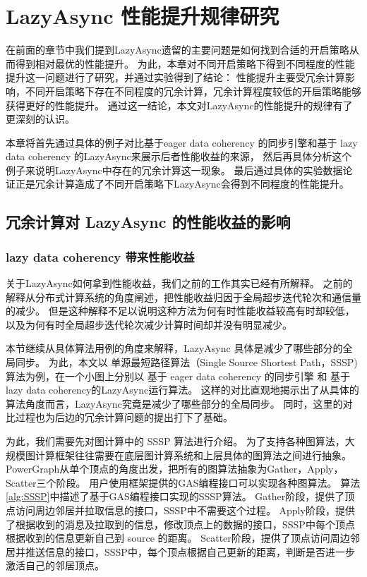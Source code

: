 

\chapter{LazyAsync 性能提升规律研究}
在前面的章节中我们提到LazyAsync遗留的主要问题是如何找到合适的开启策略从而得到相对最优的性能提升。
为此，本章对不同开启策略下得到不同程度的性能提升这一问题进行了研究，并通过实验得到了结论：
性能提升主要受冗余计算影响，不同开启策略下存在不同程度的冗余计算，冗余计算程度较低的开启策略能够获得更好的性能提升。
通过这一结论，本文对LazyAsync的性能提升的规律有了更深刻的认识。

本章将首先通过具体的例子对比基于eager data coherency 的同步引擎和基于 lazy data coherency 的LazyAsync来展示后者性能收益的来源，
然后再具体分析这个例子来说明LazyAsync中存在的冗余计算这一现象。
最后通过具体的实验数据论证正是冗余计算造成了不同开启策略下LazyAsync会得到不同程度的性能提升。



\section{冗余计算对 LazyAsync 的性能收益的影响}
\subsection{lazy data coherency 带来性能收益}
关于LazyAsync如何拿到性能收益，我们之前的工作其实已经有所解释。
之前的解释从分布式计算系统的角度阐述，把性能收益归因于全局超步迭代轮次和通信量的减少。
但是这种解释不足以说明这种方法为何有时性能收益较高有时却较低，以及为何有时全局超步迭代轮次减少计算时间却并没有明显减少。


本节继续从具体算法用例的角度来解释，LazyAsync 具体是减少了哪些部分的全局同步。
为此，本文以 单源最短路径算法（Single Source Shortest Path，SSSP)算法为例，在一个小图上分别以 基于 eager data coherency 的同步引擎
和 基于lazy data coherency的LazyAsync运行算法。
这样的对比直观地揭示出了从具体的算法角度而言，LazyAsync究竟是减少了哪些部分的全局同步。
同时，这里的对比过程也为后边的冗余计算问题的提出打下了基础。


为此，我们需要先对图计算中的 SSSP 算法进行介绍。
为了支持各种图算法，大规模图计算框架往往需要在底层图计算系统和上层具体的图算法之间进行抽象。
PowerGraph从单个顶点的角度出发\cite{McCune@CS15}，把所有的图算法抽象为Gather，Apply，Scatter三个阶段。
用户使用框架提供的GAS编程接口可以实现各种图算法。
算法\ref{alg:SSSP}中描述了基于GAS编程接口实现的SSSP算法。
Gather阶段，提供了顶点访问周边邻居并拉取信息的接口，SSSP中不需要这个过程。
Apply阶段，提供了根据收到的消息及拉取到的信息，修改顶点上的数据的接口，SSSP中每个顶点根据收到的信息更新自己到 source 的距离。
Scatter阶段，提供了顶点访问周边邻居并推送信息的接口，SSSP中，每个顶点根据自己更新的距离，判断是否进一步激活自己的邻居顶点。


